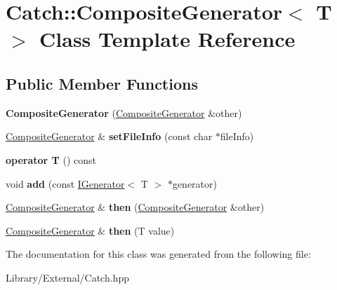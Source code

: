 \hypertarget{class_catch_1_1_composite_generator}{}\section{Catch\+:\+:Composite\+Generator$<$ T $>$ Class Template Reference}
\label{class_catch_1_1_composite_generator}
\subsection*{Public Member Functions}
\begin{DoxyCompactItemize}
\item 
\hypertarget{class_catch_1_1_composite_generator_a21a7070a00e4a6fe021294c356692692}{}{\bfseries Composite\+Generator} (\hyperlink{class_catch_1_1_composite_generator}{Composite\+Generator} \&other)\label{class_catch_1_1_composite_generator_a21a7070a00e4a6fe021294c356692692}

\item 
\hypertarget{class_catch_1_1_composite_generator_ac3c57cf4ca5472f440bf71e2936bcd4a}{}\hyperlink{class_catch_1_1_composite_generator}{Composite\+Generator} \& {\bfseries set\+File\+Info} (const char $\ast$file\+Info)\label{class_catch_1_1_composite_generator_ac3c57cf4ca5472f440bf71e2936bcd4a}

\item 
\hypertarget{class_catch_1_1_composite_generator_aa3f627d84fb256df0404d19d7fd4b784}{}{\bfseries operator T} () const \label{class_catch_1_1_composite_generator_aa3f627d84fb256df0404d19d7fd4b784}

\item 
\hypertarget{class_catch_1_1_composite_generator_af3774d42ad2d3453d089ca599efe0517}{}void {\bfseries add} (const \hyperlink{struct_catch_1_1_i_generator}{I\+Generator}$<$ T $>$ $\ast$generator)\label{class_catch_1_1_composite_generator_af3774d42ad2d3453d089ca599efe0517}

\item 
\hypertarget{class_catch_1_1_composite_generator_a2e03f42df85cdd238aabd77a80b075d5}{}\hyperlink{class_catch_1_1_composite_generator}{Composite\+Generator} \& {\bfseries then} (\hyperlink{class_catch_1_1_composite_generator}{Composite\+Generator} \&other)\label{class_catch_1_1_composite_generator_a2e03f42df85cdd238aabd77a80b075d5}

\item 
\hypertarget{class_catch_1_1_composite_generator_aefdc11bcfccdf07d2db5f0da3ed8758c}{}\hyperlink{class_catch_1_1_composite_generator}{Composite\+Generator} \& {\bfseries then} (T value)\label{class_catch_1_1_composite_generator_aefdc11bcfccdf07d2db5f0da3ed8758c}

\end{DoxyCompactItemize}


The documentation for this class was generated from the following file\+:\begin{DoxyCompactItemize}
\item 
Library/\+External/Catch.\+hpp\end{DoxyCompactItemize}
